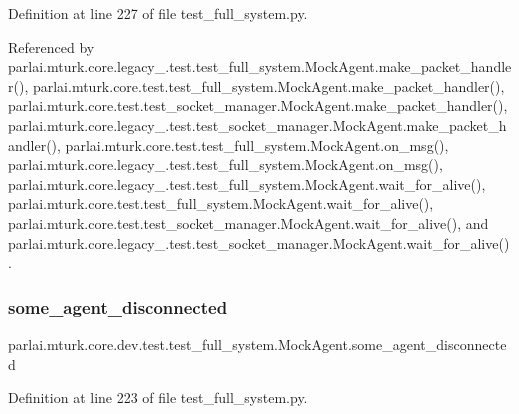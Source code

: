 Definition at line 227 of file test\+\_\+full\+\_\+system.\+py.



Referenced by parlai.\+mturk.\+core.\+legacy\+\_.\+test.\+test\+\_\+full\+\_\+system.\+Mock\+Agent.\+make\+\_\+packet\+\_\+handler(), parlai.\+mturk.\+core.\+test.\+test\+\_\+full\+\_\+system.\+Mock\+Agent.\+make\+\_\+packet\+\_\+handler(), parlai.\+mturk.\+core.\+test.\+test\+\_\+socket\+\_\+manager.\+Mock\+Agent.\+make\+\_\+packet\+\_\+handler(), parlai.\+mturk.\+core.\+legacy\+\_.\+test.\+test\+\_\+socket\+\_\+manager.\+Mock\+Agent.\+make\+\_\+packet\+\_\+handler(), parlai.\+mturk.\+core.\+test.\+test\+\_\+full\+\_\+system.\+Mock\+Agent.\+on\+\_\+msg(), parlai.\+mturk.\+core.\+legacy\+\_.\+test.\+test\+\_\+full\+\_\+system.\+Mock\+Agent.\+on\+\_\+msg(), parlai.\+mturk.\+core.\+legacy\+\_.\+test.\+test\+\_\+full\+\_\+system.\+Mock\+Agent.\+wait\+\_\+for\+\_\+alive(), parlai.\+mturk.\+core.\+test.\+test\+\_\+full\+\_\+system.\+Mock\+Agent.\+wait\+\_\+for\+\_\+alive(), parlai.\+mturk.\+core.\+test.\+test\+\_\+socket\+\_\+manager.\+Mock\+Agent.\+wait\+\_\+for\+\_\+alive(), and parlai.\+mturk.\+core.\+legacy\+\_.\+test.\+test\+\_\+socket\+\_\+manager.\+Mock\+Agent.\+wait\+\_\+for\+\_\+alive().

\mbox{\label{classparlai_1_1mturk_1_1core_1_1dev_1_1test_1_1test__full__system_1_1MockAgent_a1c466d041b94b63d9234a9221e900da6}} 
\subsubsection{\texorpdfstring{some\+\_\+agent\+\_\+disconnected}{some\_agent\_disconnected}}
{\footnotesize\ttfamily parlai.\+mturk.\+core.\+dev.\+test.\+test\+\_\+full\+\_\+system.\+Mock\+Agent.\+some\+\_\+agent\+\_\+disconnected}



Definition at line 223 of file test\+\_\+full\+\_\+system.\+py.




